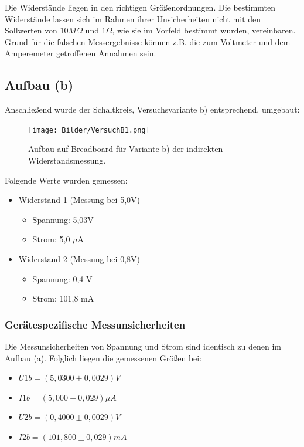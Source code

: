 \documentclass[class=article, crop=false]{standalone}
\begin{document}
Die Widerstände liegen in den richtigen Größenordnungen. Die bestimmten
Widerstände lassen sich im Rahmen ihrer Unsicherheiten nicht mit den
Sollwerten von \(10M\Omega\) und \(1\Omega\), wie sie im Vorfeld
bestimmt wurden, vereinbaren. Grund für die falschen Messergebnisse
können z.B. die zum Voltmeter und dem Amperemeter getroffenen Annahmen
sein.

\hypertarget{aufbau-b}{%
\subsection{Aufbau (b)}\label{aufbau-b}}

Anschließend wurde der Schaltkreis, Versuchsvariante b) entsprechend,
umgebaut:

\begin{figure}
\centering
\texttt{[image: Bilder/VersuchB1.png]}
\caption{Aufbau auf Breadboard für Variante b) der indirekten
Widerstandsmessung.}
\end{figure}

Folgende Werte wurden gemessen:

\begin{itemize}
\item {Widerstand 1 (Messung bei 5,0V)}
\begin{itemize}
\item {Spannung: 5,03V}
\item {Strom: 5,0 $\mu$A}
\end{itemize}
\item {Widerstand 2 (Messung bei 0,8V)}
\begin{itemize}
\item {Spannung: 0,4 V}
\item {Strom: 101,8 mA}
\end{itemize}
\end{itemize}

\hypertarget{geruxe4tespezifische-messunsicherheiten-1}{%
\subsubsection{Gerätespezifische
Messunsicherheiten}\label{geruxe4tespezifische-messunsicherheiten-1}}

Die Messunsicherheiten von Spannung und Strom sind identisch zu denen im
Aufbau (a). Folglich liegen die gemessenen Größen bei:

\begin{itemize}
\item $U1b = (5,0300 \pm 0,0029)V$
\item $I1b = (5,000 \pm 0,029) \mu A$
\item $U2b = (0,4000 \pm 0,0029)V$
\item $I2b = (101,800 \pm 0,029) mA$
\end{itemize}
\end{document}
